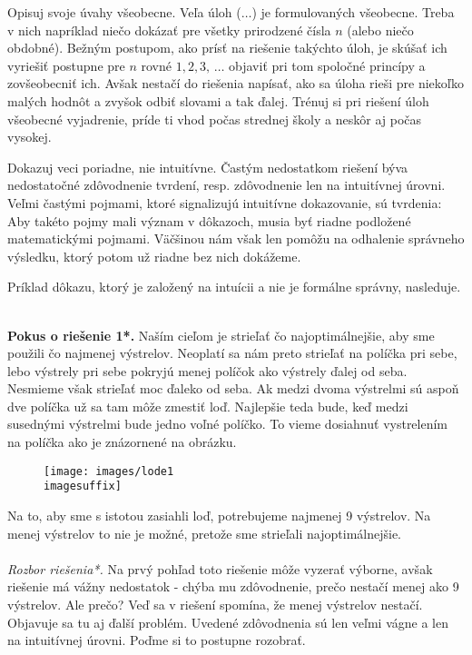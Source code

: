 {Opisuj svoje úvahy všeobecne. Veľa úloh ($\ldots$) je formulovaných všeobecne. Treba v nich napríklad niečo dokázať pre všetky prirodzené čísla $n$ (alebo niečo obdobné). Bežným postupom, ako prísť na riešenie takýchto úloh, je skúšať ich vyriešiť postupne pre $n$ rovné $1, 2, 3,\,\ldots$ objaviť pri tom spoločné princípy a zovšeobecniť ich. Avšak nestačí do riešenia napísať, ako sa úloha rieši pre niekoľko malých hodnôt a zvyšok odbiť slovami a tak ďalej. Trénuj si pri riešení úloh všeobecné vyjadrenie, príde ti vhod počas strednej školy a neskôr aj počas vysokej.

Dokazuj veci poriadne, nie intuitívne. Častým nedostatkom riešení býva nedostatočné zdôvodnenie tvrdení, resp. zdôvodnenie len na intuitívnej úrovni. Veľmi častými pojmami, ktoré signalizujú intuitívne dokazovanie, sú tvrdenia:    Aby takéto pojmy mali význam v dôkazoch, musia byť riadne podložené matematickými pojmami. Väčšinou nám však len pomôžu na odhalenie správneho výsledku, ktorý potom už riadne bez nich dokážeme.

Príklad dôkazu, ktorý je založený na intuícii a nie je formálne správny, nasleduje.\\
\\
{\textbf{Pokus o riešenie 1*.}
Naším cieľom je strieľať čo najoptimálnejšie, aby sme použili čo najmenej výstrelov. Neoplatí sa nám preto strieľať na políčka pri sebe, lebo výstrely pri sebe pokryjú menej políčok ako výstrely ďalej od seba. Nesmieme však strieľať moc ďaleko od seba. Ak medzi dvoma výstrelmi sú aspoň dve políčka už sa tam môže zmestiť loď. Najlepšie teda bude, keď medzi susednými výstrelmi bude jedno voľné políčko. To vieme dosiahnuť vystrelením na políčka ako je znázornené na obrázku.
\begin{figure}[h]
    \centering
    \texttt{[image: images/lode1\\imagesuffix]}
    \caption{}
    \label{fig:lode1}
\end{figure}
Na to, aby sme s istotou zasiahli loď, potrebujeme najmenej 9 výstrelov. Na menej výstrelov to nie je možné, pretože sme strieľali najoptimálnejšie.\\
\\
\textit{Rozbor riešenia*.} Na prvý pohľad toto riešenie môže vyzerať výborne, avšak riešenie má vážny nedostatok - chýba mu zdôvodnenie, prečo nestačí menej ako 9 výstrelov. Ale prečo? Veď sa v riešení spomína, že menej výstrelov nestačí. Objavuje sa tu aj ďalší problém. Uvedené zdôvodnenia sú len veľmi vágne a len na intuitívnej úrovni. Poďme si to postupne rozobrať.

}}
